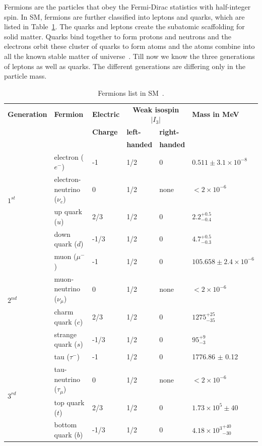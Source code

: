Fermions are the particles that obey the Fermi-Dirac statistics with half-integer spin.
In SM, fermions are further classified into leptons and quarks, which are listed in Table~\ref{table:smfermions}.
The quarks and leptons create the subatomic scaffolding for solid matter.
Quarks bind together to form protons and neutrons and the electrons orbit these cluster of quarks to form atoms and the atoms combine into all the known stable matter of universe~\cite{SM-buildingblock_uslhc}.
Till now we know the three generations of leptons as well as quarks. The different generations are differing only in the particle mass.
\begin{table}
\centering
{\small
\begin{tabular}[!htbp]{l l l l l l}
\hline
{\textbf{Generation}} & {\textbf{Fermion}} & {\textbf{Electric}} & \multicolumn{2}{c}{\textbf{Weak isospin $|I_3|$}} & \textbf{Mass in MeV} \\
    &           &    \textbf{Charge}  & \textbf{left-} & \textbf{right-} &     \\
    &           &                     & \textbf{handed} & \textbf{handed} &    \\
\hline
\multirow{4}{*}{$1^{st}$} & electron ($e^-$)           &   -1 & 1/2 &  0    &   $0.511\pm 3.1\times 10^{-8}$ \\
         & electron-neutrino ($\nu_e$)&   0  & 1/2 &  none &   $<2 \times 10^{-6}$   \\
         & up quark ($u$)             &  2/3 & 1/2 &  0    &   $2.2^{+0.5}_{-0.4}$  \\
         & down quark ($d$)           & -1/3 & 1/2 &  0    &   $4.7^{+0.5}_{-0.3}$  \\
\hline
\multirow{4}{*}{$2^{nd}$} & muon ($\mu^-$)             &  -1  & 1/2 &  0    &   $105.658 \pm 2.4 \times 10^{-6}$ \\
         & muon-neutrino ($\nu_{\mu}$)& 0    & 1/2 &  none &   $<2 \times 10^{-6}$   \\
         & charm quark ($c$)                & 2/3  & 1/2 &  0    &   $1275^{+25}_{-35}$     \\
         & strange quark ($s$)              & -1/3 & 1/2 &  0    &   $95^{+9}_{-3}$       \\
\hline
\multirow{4}{*}{$3^{rd}$} & tau ($\tau^-$)             & -1   & 1/2 &  0    &    1776.86 $\pm$ 0.12    \\
         & tau-neutrino ($\tau_{\mu}$)& 0    & 1/2 &  none &   $<2 \times 10^{-6}$   \\
         & top quark ($t$)                  & 2/3  & 1/2 &  0    &   $1.73\times 10^5\pm 40$\\
         & bottom quark ($b$)               & -1/3 & 1/2 &  0    &   ${4.18 \times 10^{3}}^{+40}_{-30}$\\
\hline
\end{tabular}
\caption{Fermions list in SM~\cite{PDG2018}.}
\label{table:smfermions}
}
\end{table}

